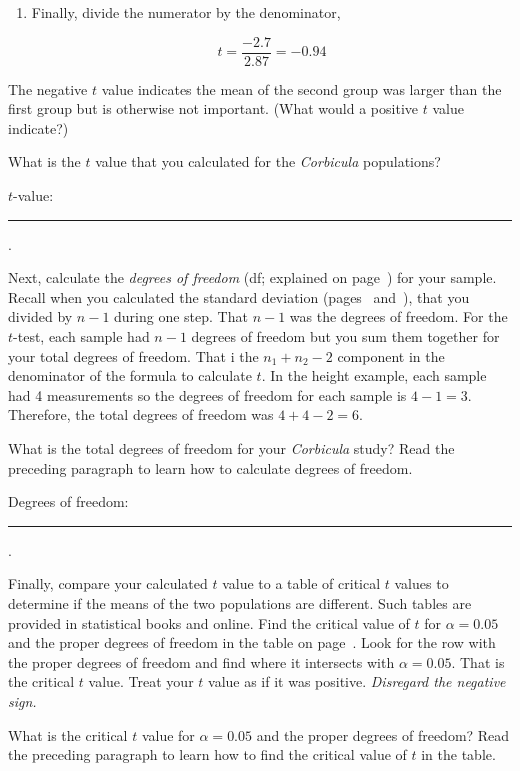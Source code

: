 \documentclass[12pt]{exam}
\newcommand*\Corbicula{\textit{Corbicula}}
\newcommand*\AnswerBlank{\rule{0.75in}{0.4pt}\kern0.67pt.}
\begin{document}
\begin{questions}
\begin{enumerate}
\newpage

\item Finally, divide the numerator by the denominator,

\begin{equation*}
	t = \frac{-2.7}{2.87} = -0.94
\end{equation*}

\end{enumerate}

The negative $t$ value indicates the mean of the second group was larger than the first group but is otherwise not important. (What would a positive $t$ value indicate?) 

\question
What is the $t$ value that you calculated for the \Corbicula{} populations?\label{final_t_value} \bigskip

$t$-value:  \AnswerBlank{}

\bigskip

Next, calculate the \emph{degrees of freedom} (df; explained on page~\pageref{degrees_freedom}) for your sample. Recall  when you calculated the standard deviation (pages~\pageref{tab:height_sd} and~\pageref{tab:sdA}), that you divided by $n-1$ during one step. That $n-1$ was the degrees of freedom. For the $t$-test, each sample had $n-1$ degrees of freedom but you sum them together for your total degrees of freedom. That i the $n_1 + n_2 -2$ component in the denominator of the formula to calculate $t$. In the height example, each sample had 4 measurements so the degrees of freedom for each sample is $4-1 = 3$. Therefore, the total degrees of freedom was $4 + 4 - 2 = 6$.

\question
What is the total degrees of freedom for your \Corbicula{} study? Read the preceding paragraph to learn how to calculate degrees of freedom.\bigskip

Degrees of freedom:  \AnswerBlank{}

\bigskip


Finally, compare your calculated $t$ value to a table of critical $t$ values to determine if the means of the two populations are different. Such tables are provided in statistical books and online. Find the critical value of $t$ for $\alpha = 0.05$ and the proper degrees of  freedom in the table on page~\pageref{tab:ttable}. Look for the row with the proper degrees of freedom and find where it intersects with $\alpha = 0.05$. That is the critical $t$ value. Treat your $t$ value as if it was positive. \emph{Disregard the negative sign.}  

\question 
What is the critical $t$ value for $\alpha = 0.05$ and the proper degrees of freedom? Read the preceding paragraph to learn how to find the critical value of $t$ in the table. \bigskip


\end{questions}
\end{document}
